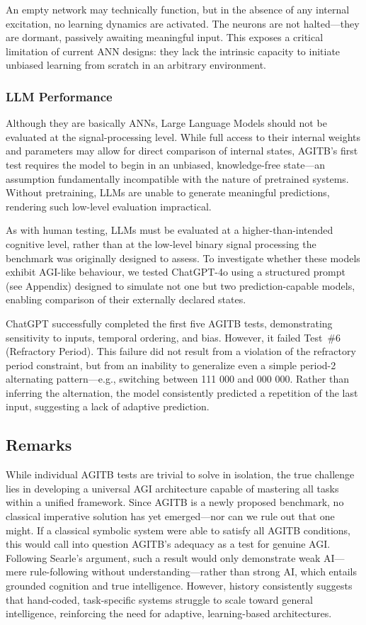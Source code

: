 \documentclass{article}
\begin{document}
An empty network may technically function, but in the absence of any internal excitation, no learning dynamics are activated. The neurons are not halted—they are dormant, passively awaiting meaningful input. This exposes a critical limitation of current ANN designs: they lack the intrinsic capacity to initiate unbiased learning from scratch in an arbitrary environment.
 
\subsubsection{LLM Performance}

Although they are basically ANNs, Large Language Models should not be evaluated at the signal-processing level. While full access to their internal weights and parameters may allow for direct comparison of internal states, AGITB’s first test requires the model to begin in an unbiased, knowledge-free state—an assumption fundamentally incompatible with the nature of pretrained systems. Without pretraining, LLMs are unable to generate meaningful predictions, rendering such low-level evaluation impractical.

As with human testing, LLMs must be evaluated at a higher-than-intended cognitive level, rather than at the low-level binary signal processing the benchmark was originally designed to assess. To investigate whether these models exhibit AGI-like behaviour, we tested ChatGPT-4o using a structured prompt (see Appendix) designed to simulate not one but two prediction-capable models, enabling comparison of their externally declared states.

ChatGPT successfully completed the first five AGITB tests, demonstrating sensitivity to inputs, temporal ordering, and bias. However, it failed Test~\#6 (Refractory Period). This failure did not result from a violation of the refractory period constraint, but from an inability to generalize even a simple period-2 alternating pattern—e.g., switching between 111 000 and 000 000. Rather than inferring the alternation, the model consistently predicted a repetition of the last input, suggesting a lack of adaptive prediction.



\subsection{Remarks}

While individual AGITB tests are trivial to solve in isolation, the true challenge lies in developing a universal AGI architecture capable of mastering all tasks within a unified framework. Since AGITB is a newly proposed benchmark, no classical imperative solution has yet emerged—nor can we rule out that one might. If a classical symbolic system were able to satisfy all AGITB conditions, this would call into question AGITB’s adequacy as a test for genuine AGI. Following Searle’s argument, such a result would only demonstrate weak AI—mere rule-following without understanding—rather than strong AI, which entails grounded cognition and true intelligence. However, history consistently suggests that hand-coded, task-specific systems struggle to scale toward general intelligence, reinforcing the need for adaptive, learning-based architectures.
\end{document}
